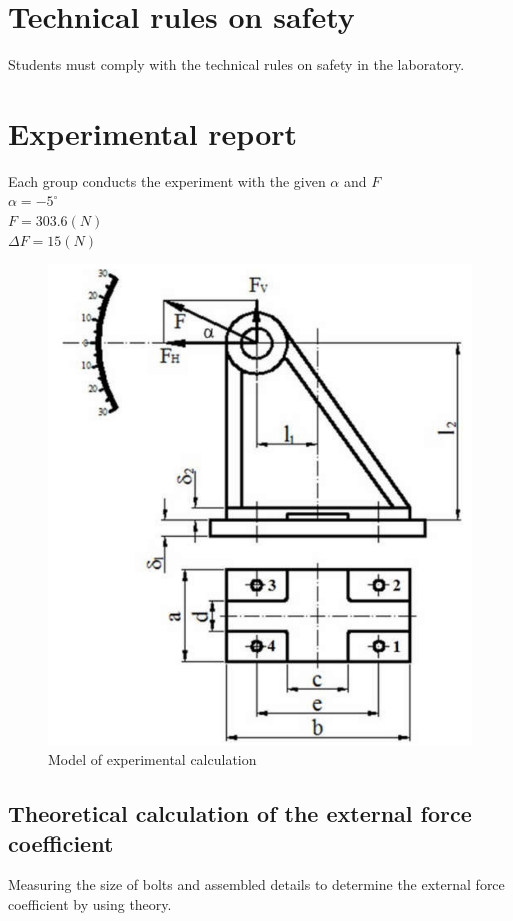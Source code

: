 \section{Technical rules on safety}
Students must comply with the technical rules on safety in the laboratory.

\section{Experimental report}
Each group conducts the experiment with the given $ \alpha $ and $ F $\\
$ \alpha = -5^\circ $\\
$ F = 303.6\unit{(N)} $\\
$ \Delta F = 15\unit{(N)} $
\begin{figure}
	\centering
	\includegraphics[width=150mm]{modelexp4.png}
	\caption{Model of experimental calculation}
	\label{exp4fig}
\end{figure}
\subsection{Theoretical calculation of the external force coefficient}
Measuring the size of bolts and assembled details to determine the external force
coefficient by using theory.
